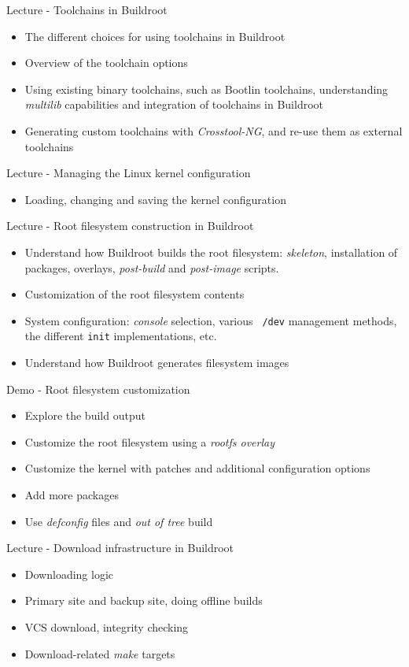 \documentclass[a4paper,12pt,obeyspaces,spaces,hyphens]{article}
\begin{document}
\feagendaonecolumn
{Lecture - Toolchains in Buildroot}
{
  \begin{itemize}
  \item The different choices for using toolchains in Buildroot
  \item Overview of the toolchain options
  \item Using existing binary toolchains, such as Bootlin
    toolchains, understanding {\em multilib} capabilities and
    integration of toolchains in Buildroot
  \item Generating custom toolchains with {\em Crosstool-NG}, and
    re-use them as external toolchains
  \end{itemize}
}

\feagendatwocolumn
{Lecture - Managing the Linux kernel configuration}
{
  \begin{itemize}
  \item Loading, changing and saving the kernel configuration
  \end{itemize}
}
{Lecture - Root filesystem construction in Buildroot}
{
  \begin{itemize}
  \item Understand how Buildroot builds the root filesystem: {\em
      skeleton}, installation of packages, overlays, {\em post-build}
    and {\em post-image} scripts.
  \item Customization of the root filesystem contents
  \item System configuration: {\em console} selection, various {\tt
      /dev} management methods, the different {\tt init}
    implementations, etc.
  \item Understand how Buildroot generates filesystem images
  \end{itemize}
}

\feagendaonecolumn
{Demo - Root filesystem customization}
{
  \begin{itemize}
  \item Explore the build output
  \item Customize the root filesystem using a {\em rootfs overlay}
  \item Customize the kernel with patches and additional configuration
    options
  \item Add more packages
  \item Use {\em defconfig} files and {\em out of tree} build
  \end{itemize}
}

\feagendaonecolumn
{Lecture - Download infrastructure in Buildroot}
{
  \begin{itemize}
  \item Downloading logic
  \item Primary site and backup site, doing offline builds
  \item VCS download, integrity checking
  \item Download-related {\em make} targets
  \end{itemize}
}
\end{document}

